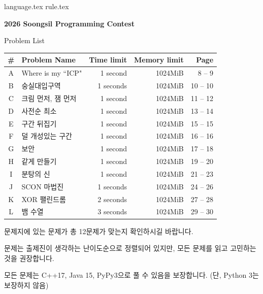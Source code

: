 \documentclass[11pt,a4paper,oneside]{article}
\begin{document}
    \def\NoInputFileName{}
    \def\NoOutputFileName{}
    
%
    {language.tex} \pagebreak
    {rule.tex} \pagebreak
%
    \begin{center}
    
    \vspace*{15mm}
    {
        \Huge
        \textbf{2026 Soongsil Programming Contest}
        
        \vspace{25mm}
        Problem List
        \vspace{10mm}
    }
    
    \begin{tabular}{|c|l|r|r|r|}
    \hline
    \# & Problem Name & Time limit & Memory limit & Page \\ \hline
        A & Where is my ``ICP" & 1 second\phantom{s} & 1024MiB & \phantom{0}8 -- \phantom{0}9 \\ \hline
        B & 숭실대입구역 & 1 seconds & 1024MiB & 10 -- 10 \\ \hline
        C & 크림 먼저, 잼 먼저 & 1 second\phantom{s} & 1024MiB & 11 -- 12 \\ \hline
        D & 사전순 최소 & 1 second\phantom{s} & 1024MiB & 13 -- 14 \\ \hline
        E & 구간 뒤집기 & 1 second\phantom{s} & 1024MiB & 15 -- 15 \\ \hline
        F & 덜 개성있는 구간 & 1 second\phantom{s} & 1024MiB & 16 -- 16 \\ \hline
        G & 보안 & 1 second\phantom{s} & 1024MiB & 17 -- 18 \\ \hline
        H & 같게 만들기 & 1 second\phantom{s} & 1024MiB & 19 -- 20 \\ \hline
        I & 분탕의 신 & 1 second\phantom{s} & 1024MiB & 21 -- 23 \\ \hline
        J & SCON 마법진 & 1 seconds & 1024MiB & 24 -- 26 \\ \hline
        K & XOR 팰린드롬 & 2 seconds & 1024MiB & 27 -- 28 \\ \hline
        L & 뱀 수열 & 3 seconds & 1024MiB & 29 -- 30 \\ \hline
    \end{tabular}

    \vspace{5mm}
    
    문제지에 있는 문제가 총 12문제가 맞는지 확인하시길 바랍니다.

    문제는 출제진이 생각하는 난이도순으로 정렬되어 있지만, 모든 문제를 읽고 고민하는 것을 권장합니다.

    모든 문제는 C++17, Java 15, PyPy3으로 풀 수 있음을 보장합니다. (단, Python 3는 보장하지 않음)
    
    \end{center}
    	
\end{document}
